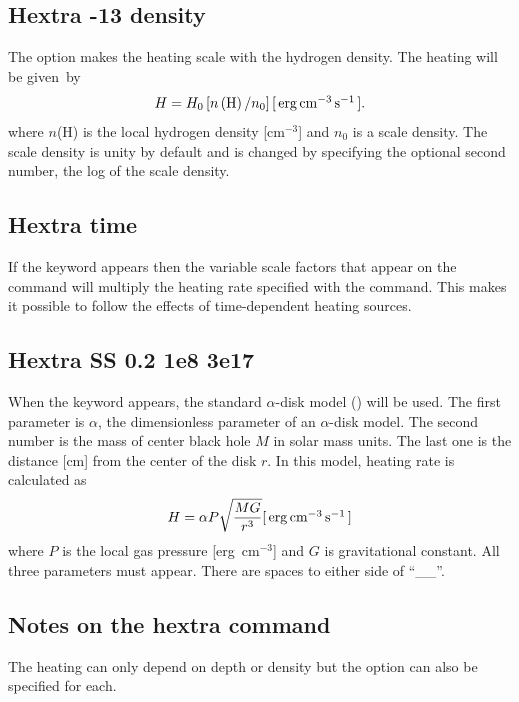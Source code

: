 \subsection{Hextra -13 density }

The  option makes the heating scale with the
hydrogen density.
The heating will be given~by
\begin{equation}
H = H_0 \left[ {n\left( \mathrm{H} \right)/n_0 } \right]
[\mbox{${\rm\thinspace erg}{\rm\thinspace cm}^{-3}{\rm\thinspace s}^{-1}\,$} ].
\end{equation}
where $n$(H) is the local hydrogen density [cm$^{-3}$]
and $n_0$ is a scale density.
The scale density is unity by default and is changed by specifying the
optional second number, the log of the scale density.

\subsection{Hextra time}

If the  keyword appears then the variable
scale factors that appear
on the  command will multiply the heating
rate specified with the  command.
This makes it possible to follow
the effects of time-dependent heating sources.

\subsection{Hextra SS 0.2 1e8 3e17}

When the keyword  appears, the standard $\alpha$-disk model
(\citet{Shakura1973}) will be used. The first parameter is $\alpha$, 
the dimensionless parameter of an $\alpha$-disk model. 
The second number is the mass of center black hole $M$ in solar mass units. 
The last one is the distance [cm] from the center of the disk $r$. 
In this model, heating rate is calculated as
\begin{equation}
H=\alpha P\sqrt{\frac{MG}{r^3}}[\mbox{${\rm\thinspace erg}{\rm\thinspace cm}^{-3}{\rm\thinspace s}^{-1}\,$}]
\end{equation}
where $P$ is the local gas pressure [erg~cm$^{-3}$] 
and $G$ is gravitational constant. 
All three parameters must appear.
There are spaces to either side of
``\_\_''. 

\subsection{Notes on the hextra command}

The heating can only depend on depth or density
but the  option can
also be specified for each.

